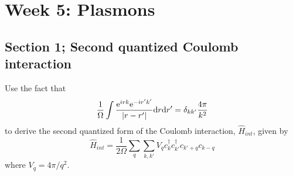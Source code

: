 \section{Week 5: Plasmons}

\subsection{Section 1; Second quantized Coulomb interaction}
\begin{exercise}
Use the fact that
\begin{equation}
    \dfrac{1}{\Omega} \int \dfrac{\mathrm{e}^{irk}\mathrm{e}^{-ir'k'}}{\abs{r-r'}}\mathrm{d}r\mathrm{d}r' = \delta_{kk'} \frac{4 \pi}{k^2}
\end{equation}
to derive the second quantized form of the Coulomb interaction, $\hat{H}_{int}$, given by
\begin{equation}
    \hat{H}_{int} = \dfrac{1}{2\Omega}\sum_q\sum_{k,k'}V_q c^{\dagger}_{k}c^{\dagger}_{k'}c_{k'+q}c_{k-q}
\end{equation}
where $V_q = 4\pi/q^2$.
\end{exercise}
